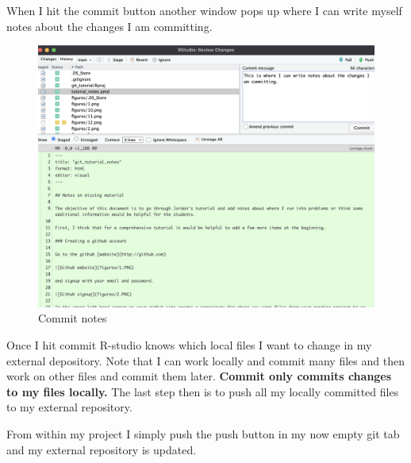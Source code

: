 \documentclass[
  letterpaper,
  DIV=11,
  numbers=noendperiod]{scrartcl}
\begin{document}
When I hit the commit button another window pops up where I can write
myself notes about the changes I am committing.

\begin{figure}

{\centering \includegraphics{figures/13.PNG}

}

\caption{Commit notes}

\end{figure}

Once I hit commit R-studio knows which local files I want to change in
my external depository. Note that I can work locally and commit many
files and then work on other files and commit them later. \textbf{Commit
only commits changes to my files locally.} The last step then is to push
all my locally committed files to my external repository.

From within my project I simply push the push button in my now empty git
tab and my external repository is updated.
\end{document}
